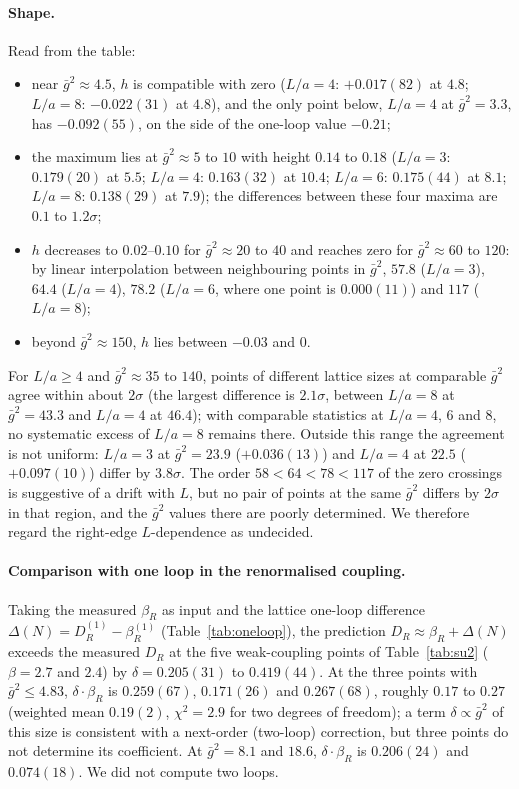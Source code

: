 \documentclass[11pt,a4paper]{article}
\theoremstyle{definition}
\theoremstyle{remark}
\newcommand{\gb}{\bar g^{2}}
\newcommand{\bR}{\beta_R}
\newcommand{\DR}{D_R}
\begin{document}
\paragraph{Shape.} Read from the table:
\begin{itemize}[leftmargin=2em]
\item near $\gb\approx4.5$, $h$ is compatible with zero ($L/a=4$: $+0.017(82)$ at $4.8$; $L/a=8$: $-0.022(31)$ at $4.8$), and the only point below, $L/a=4$ at $\gb=3.3$, has $-0.092(55)$, on the side of the one-loop value $-0.21$;
\item the maximum lies at $\gb\approx5$ to $10$ with height $0.14$ to $0.18$ ($L/a=3$: $0.179(20)$ at $5.5$; $L/a=4$: $0.163(32)$ at $10.4$; $L/a=6$: $0.175(44)$ at $8.1$; $L/a=8$: $0.138(29)$ at $7.9$); the differences between these four maxima are $0.1$ to $1.2\sigma$;
\item $h$ decreases to $0.02$--$0.10$ for $\gb\approx20$ to $40$ and reaches zero for $\gb\approx60$ to $120$: by linear interpolation between neighbouring points in $\gb$, $57.8$ ($L/a=3$), $64.4$ ($L/a=4$), $78.2$ ($L/a=6$, where one point is $0.000(11)$) and $117$ ($L/a=8$);
\item beyond $\gb\approx150$, $h$ lies between $-0.03$ and $0$.
\end{itemize}
For $L/a\ge4$ and $\gb\approx35$ to $140$, points of different lattice sizes at comparable $\gb$ agree within about $2\sigma$ (the largest difference is $2.1\sigma$, between $L/a=8$ at $\gb=43.3$ and $L/a=4$ at $46.4$); with comparable statistics at $L/a=4$, $6$ and $8$, no systematic excess of $L/a=8$ remains there. Outside this range the agreement is not uniform: $L/a=3$ at $\gb=23.9$ ($+0.036(13)$) and $L/a=4$ at $22.5$ ($+0.097(10)$) differ by $3.8\sigma$. The order $58<64<78<117$ of the zero crossings is suggestive of a drift with $L$, but no pair of points at the same $\gb$ differs by $2\sigma$ in that region, and the $\gb$ values there are poorly determined. We therefore regard the right-edge $L$-dependence as undecided.

\paragraph{Comparison with one loop in the renormalised coupling.} Taking the measured $\bR$ as input and the lattice one-loop difference $\Delta(N)=\DR^{(1)}-\bR^{(1)}$ (Table~\ref{tab:oneloop}), the prediction $\DR\approx\bR+\Delta(N)$ exceeds the measured $\DR$ at the five weak-coupling points of Table~\ref{tab:su2} ($\beta=2.7$ and $2.4$) by $\delta=0.205(31)$ to $0.419(44)$. At the three points with $\gb\le4.83$, $\delta\cdot\bR$ is $0.259(67)$, $0.171(26)$ and $0.267(68)$, roughly $0.17$ to $0.27$ (weighted mean $0.19(2)$, $\chi^2=2.9$ for two degrees of freedom); a term $\delta\propto\gb$ of this size is consistent with a next-order (two-loop) correction, but three points do not determine its coefficient. At $\gb=8.1$ and $18.6$, $\delta\cdot\bR$ is $0.206(24)$ and $0.074(18)$. We did not compute two loops.
\end{document}

